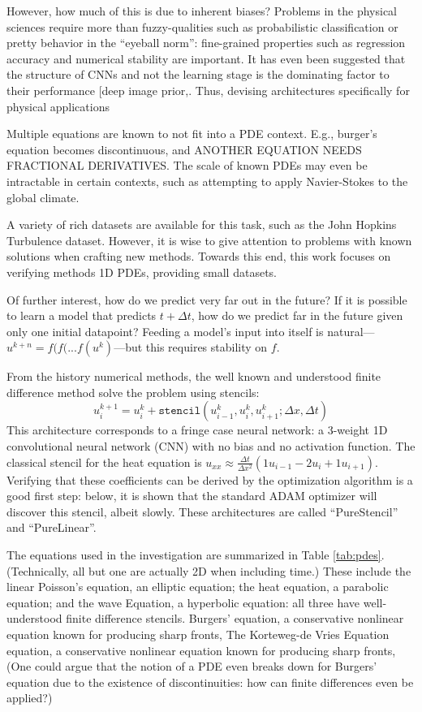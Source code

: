 \documentclass{article}
\begin{document}
However, how much of this is due to inherent biases? 
Problems in the physical sciences require more than fuzzy-qualities such as probabilistic classification or pretty behavior in the ``eyeball norm'': fine-grained properties such as regression accuracy and numerical stability are important.
It has even been suggested that the structure of CNNs and not the learning stage is the dominating factor to their performance [deep image prior,\cite{ulyanov_deep_2018,zador_critique_2019}. Thus, devising architectures specifically for physical applications 


Multiple equations are known to not fit into a PDE context. E.g., burger's equation becomes discontinuous, and ANOTHER EQUATION NEEDS FRACTIONAL DERIVATIVES. The scale of known PDEs may even be intractable in certain contexts, such as attempting to apply Navier-Stokes to the global climate.


A variety of rich datasets are available for this task, such as the John Hopkins Turbulence dataset. However, it is wise to give attention to problems with known solutions when crafting new methods. Towards this end, this work focuses on verifying methods 1D PDEs, providing small datasets.



Of further interest, how do we predict very far out in the future? If it is possible to learn a model that predicts $t+\Delta t$, how do we predict far in the future given only one initial datapoint? Feeding a model's input into itself is natural---$u^{k+n}=f(f(...f(u^k)$---but this requires stability on $f$.

From the history numerical methods, the well known and understood finite difference method solve the problem using stencils:
\begin{equation}
  u^{k+1}_{i} = u^k_{i}+\mathtt{stencil}\left( u^k_{i-1}, u^k_{i},u^{k}_{i+1}; \Delta x, \Delta t\right)
\end{equation}
This architecture corresponds to a fringe case neural network: a 3-weight 1D convolutional neural network (CNN) with no bias and no activation function. 
The classical stencil for the heat equation is $u_{xx}\approx\frac{\Delta t}{\Delta x^2} \left(1 u_{i-1} - 2 u_{i} +1 u_{i+1}\right)$.
Verifying that these coefficients can be derived by the optimization algorithm is a good first step: below, it is shown that the standard ADAM optimizer will discover this stencil, albeit slowly.
These architectures are called ``PureStencil'' and ``PureLinear''.

The equations used in the investigation are summarized in Table \ref{tab:pdes}. (Technically, all but one are actually 2D when including time.)
These include the linear Poisson's equation, an elliptic equation; the heat equation, a parabolic equation; and the wave Equation, a hyperbolic equation: all three have well-understood finite difference stencils. 
Burgers' equation, a conservative nonlinear equation known for
  producing sharp fronts,
The Korteweg-de Vries Equation equation, a conservative nonlinear equation known for
producing sharp fronts,
(One could argue that the notion of a PDE even breaks down for Burgers' equation due to the existence of discontinuities: how can finite differences even be applied?)
\end{document}
